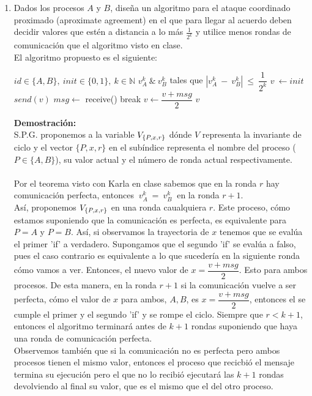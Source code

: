 \documentclass[12pt,a4paper]{report}
\begin{document}
\begin{enumerate}
	\item {
		Dados los procesos $A$ y $B$, diseña un algoritmo para el ataque coordinado
		proximado (aproximate agreement) en el que para llegar al acuerdo deben
		decidir	valores que estén a distancia a lo más $\frac{1}{2^k}$ y utilice menos
		rondas de comunicación que el algoritmo visto en clase.\\

		El algoritmo propuesto es el siguiente:\\

		\begin{algorithmic}[1]
			\Require $id \in \{A,B\},\ init \in \{0, 1\},\ k \in \mathbb{N}$
			\Ensure $v_A^k\ \& \ v_B^k$ tales que $|v_A^k\ - \ v_B^k|\ \leq\ \dfrac{1}
				{2^k}$
				\State $v\ \leftarrow init$
					\State $send(v)$
					\State $msg \leftarrow$ receive()
							\State break
						\Else	
							\State $v \leftarrow \dfrac{v + msg}{2}$
						\EndIf
					\EndIf
				\EndFor
				\State \Return$v$
			\EndFunction
		\end{algorithmic}
	}
	

	\textbf{Demostración:}\\
	S.P.G. proponemos a la variable $V_{\{P, x, r\}}$ dónde $V$ representa la
	invariante de ciclo y el vector $\{P, x, r\}$ en el subíndice representa el
	nombre del proceso ($P \in \{A,B\}$), su	valor actual y el número de ronda
	actual	respectivamente.\\\\
	
	Por el teorema visto con Karla en clase sabemos que en la ronda $r$ hay
	comunicación perfecta, entonces $\ v_A^k\  =\  v_B^k\ $ en la ronda $r + 1$.\\
	Así, proponemos $V_{\{P, x, r\}}$  en una ronda caualquiera $r$. Este proceso, cómo estamos
	suponiendo que la comunicación es perfecta, es equivalente para $P = A$ y $P = B$.
	Así, si observamos la trayectoria de $x$ tenemos que se evalúa el primer 'if' a 
	verdadero. Supongamos que el segundo 'if' se evalúa a falso, pues el caso
	contrario es equivalente a lo que sucedería en la siguiente ronda cómo vamos a
	ver. Entonces, el nuevo valor de $x = \dfrac{v + msg}{2}$. Esto para ambos
	procesos. De esta manera, en la ronda $r+1$ si la comunicación vuelve a ser
	perfecta, cómo el valor de $x$ para ambos, $A,B$, es $x = \dfrac{v + msg}{2}$,
	entonces el se cumple el primer y el segundo 'if' y se rompe el ciclo. Siempre que
	$r < k + 1$, entonces el algoritmo terminará antes de $k+1$ rondas suponiendo que
	haya una ronda de comunicación perfecta.\\
	Observemos también que si la comunicación no es perfecta pero ambos procesos
	tienen el mismo valor, entonces el proceso que recicbió el mensaje termina su 
	ejecución pero el que no lo recibió ejecutará las $k+1$ rondas devolviendo al
	final su valor, que es el mismo que el del otro proceso.
	

\end{enumerate}
\end{document}
